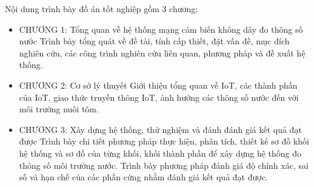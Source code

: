 Nội dung trình bày đồ án tốt nghiệp gồm 3 chương:
\begin{itemize}[label= $\triangleright$]
\item CHƯƠNG 1: Tổng quan về hệ thống mạng cảm biến không dây đo thông số nước
    Trình bày tổng quát về đề tài, tính cấp thiết, đặt vấn đề, mục đích nghiên cứu, các công trình nghiên cứu liên quan, phương pháp và đề xuất hệ thống.
\item CHƯƠNG 2: Cơ sở lý thuyết
    Giới thiệu tổng quan về IoT, các thành phần của IoT, giao thức truyền thông IoT, ảnh hưởng các thông số nước đến với môi trường nuôi tôm.
\item CHƯƠNG 3: Xây dựng hệ thống, thử nghiệm và đánh đánh giá kết quả đạt được
    Trình bày chi tiết phương pháp thực hiện, phân tích, thiết kế sơ đồ khối hệ thống và sơ đồ của từng khối, khối thành phần để xây dựng hệ thống đo thông số môi trường nước. Trình bày phương pháp đánh giá độ chính xác, sai số và hạn chế của các phần cứng nhằm đánh giá kết quả đạt được.
\end{itemize}

\cleardoublepage